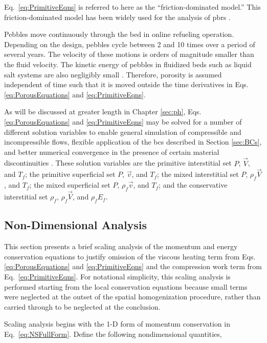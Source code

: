 \noindent Eq.\ \eqref{eq:PrimitiveEqns} is referred to here as the ``friction-dominated model.'' This friction-dominated model has been widely used for the analysis of \glspl{pbr} \cite{hossain, nouri, tecdoc1163}.  

Pebbles move continuously through the bed in online refueling operation. Depending on the design, pebbles cycle between 2 and 10 times over a period of several years. The velocity of these motions is orders of magnitude smaller than the fluid velocity. The kinetic energy of pebbles in fluidized beds such as liquid salt systems are also negligibly small \cite{mardus_hall}. Therefore, porosity is assumed independent of time such that it is moved outside the time derivatives in Eqs. \eqref{eq:PorousEquations} and \eqref{eq:PrimitiveEqns}.

As will be discussed at greater length in Chapter \ref{sec:ph}, Eqs. \eqref{eq:PorousEquations} and \eqref{eq:PrimitiveEqns} may be solved for a number of different solution variables to enable general simulation of compressible and incompressible flows, flexible application of the \glspl{bc} described in Section \ref{sec:BCs}, and better numerical convergence in the presence of certain material discontinuities \cite{hauke_1998}. These solution variables are the primitive interstitial set \(P\), \(\vec{V}\), and \(T_f\); the primitive superficial set \(P\), \(\vec{v}\), and \(T_f\); the mixed interstitial set \(P\), \(\rho_f\vec{V}\), and \(T_f\); the mixed superficial set \(P\), \(\rho_f\vec{v}\), and \(T_f\); and the conservative interstitial set \(\rho_f\), \(\rho_f\vec{V}\), and \(\rho_fE_f\).

\subsection{Non-Dimensional Analysis}
\label{sec:NonDim}

This section presents a brief scaling analysis of the momentum and energy conservation equations to justify omission of the viscous heating term from Eqs. \eqref{eq:PorousEquations} and \eqref{eq:PrimitiveEqns} and the compression work term from Eq.\ \eqref{eq:PrimitiveEqns}. For notational simplicity, this scaling analysis is performed starting from the local conservation equations because small terms were neglected at the outset of the spatial homogenization procedure, rather than carried through to be neglected at the conclusion.

Scaling analysis begins with the 1-D form of momentum conservation in Eq.\ \eqref{eq:NSFullForm}. Define the following nondimensional quantities,

